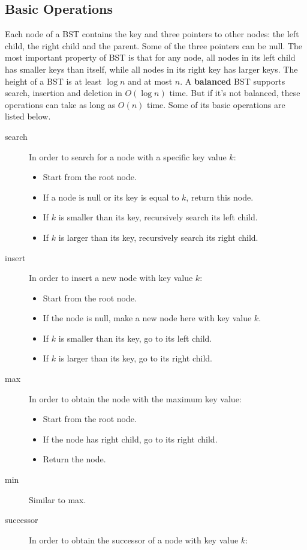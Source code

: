 \subsection{Basic Operations}
Each node of a BST contains the key and three pointers to other nodes: the left child, the right child and the parent. Some of the three pointers can be null. The most important property of BST is that for any node, all nodes in its left child has smaller keys than itself, while all nodes in its right key has larger keys. The height of a BST is at least $\log n$ and at most $n$. A \textbf{balanced} BST supports search, insertion and deletion in $O(\log n)$ time. But if it's not balanced, these operations can take as long as $O(n)$ time. Some of its basic operations are listed below.
\begin{description}
\item[search]In order to search for a node with a specific key value $k$:
\begin{itemize}
\item Start from the root node.
\item If a node is null or its key is equal to $k$, return this node.
\item If $k$ is smaller than its key, recursively search its left child.
\item If $k$ is larger than its key, recursively search its right child.
\end{itemize}
\item[insert]In order to insert a new node with key value $k$:
\begin{itemize}
\item Start from the root node.
\item If the node is null, make a new node here with key value $k$.
\item If $k$ is smaller than its key, go to its left child.
\item If $k$ is larger than its key, go to its right child.
\end{itemize}
\item[max]In order to obtain the node with the maximum key value:
\begin{itemize}
\item Start from the root node.
\item If the node has right child, go to its right child.
\item Return the node.
\end{itemize}
\item[min]Similar to max.
\item[successor]In order to obtain the successor of a node with key value $k$:

\end{description}
